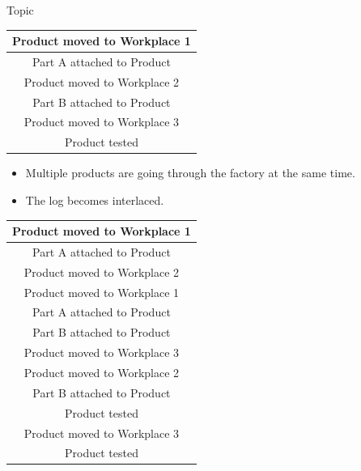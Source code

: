 \documentclass[final,xcolor={usenames,x11names}]{beamer}
\newlength{\onecolwid}
\begin{document}
\begin{frame}[t]
\begin{columns}[t]
\begin{column}{\onecolwid}
\begin{alertblock}{Topic}
\begin{center}
{
\ttfamily
\begin{tabular}{|c|}
  \hline
  \cellcolor{PaleTurquoise1}
Product moved to Workplace 1
  \\
  \hline
  \cellcolor{PaleTurquoise1}
Part A attached to Product
  \\
  \hline
  \cellcolor{PaleTurquoise1}
Product moved to Workplace 2
  \\
  \hline
  \cellcolor{PaleTurquoise1}
Part B attached to Product
  \\
  \hline
  \cellcolor{PaleTurquoise1}
Product moved to Workplace 3
  \\
  \hline
  \cellcolor{PaleTurquoise1}
Product tested
  \\
  \hline
\end{tabular}
}
\end{center}

\begin{itemize}
\item Multiple products are going through the factory at the same time.
\item The log becomes interlaced.
\end{itemize}

\begin{center}
{
\ttfamily
\begin{tabular}{|c|}
  \hline
  \cellcolor{PaleTurquoise1}
Product moved to Workplace 1
  \\
  \hline
  \cellcolor{PaleTurquoise1}
Part A attached to Product
  \\
  \hline
  \cellcolor{PaleTurquoise1}
Product moved to Workplace 2
  \\
  \hline
  \cellcolor{PaleTurquoise1>wheel,1,5}
Product moved to Workplace 1
  \\
  \hline
  \cellcolor{PaleTurquoise1>wheel,1,5}
Part A attached to Product
  \\
  \hline
  \cellcolor{PaleTurquoise1}
Part B attached to Product
  \\
  \hline
  \cellcolor{PaleTurquoise1}
Product moved to Workplace 3
  \\
  \hline
  \cellcolor{PaleTurquoise1>wheel,1,5}
Product moved to Workplace 2
  \\
  \hline
  \cellcolor{PaleTurquoise1>wheel,1,5}
Part B attached to Product
  \\
  \hline
  \cellcolor{PaleTurquoise1}
Product tested
  \\
  \hline
  \cellcolor{PaleTurquoise1>wheel,1,5}
Product moved to Workplace 3
  \\
  \hline
  \cellcolor{PaleTurquoise1>wheel,1,5}
Product tested
  \\
  \hline
\end{tabular}
}
\end{center}


\end{alertblock}
\end{column}
\end{columns}
\end{frame}
\end{document}

